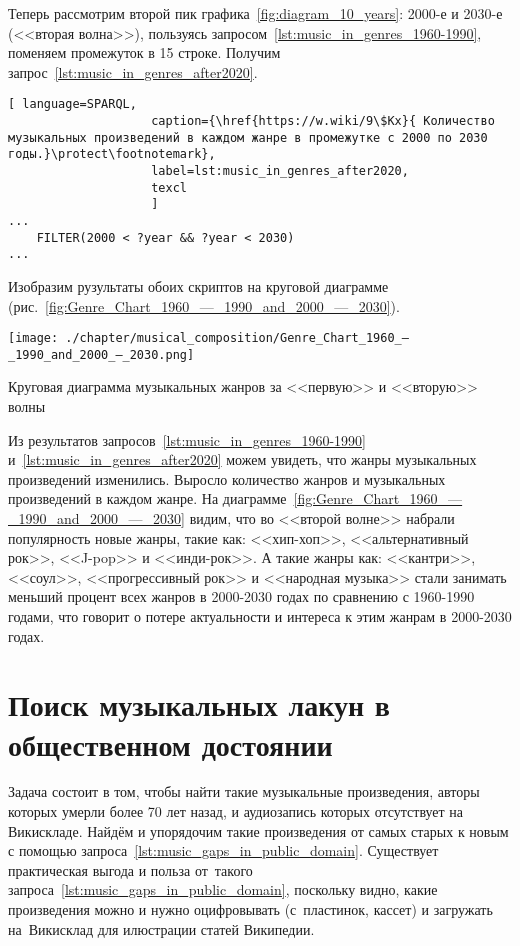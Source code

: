 \newpage
Теперь рассмотрим второй пик графика~\ref{fig:diagram_10_years}: 2000-е и 2030-е (<<вторая волна>>), пользуясь запросом~\ref{lst:music_in_genres_1960-1990}, поменяем промежуток в 15 строке. Получим запрос~\ref{lst:music_in_genres_after2020}.

\begin{lstlisting}[ language=SPARQL,
                    caption={\href{https://w.wiki/9\$Kx}{ Количество музыкальных произведений в каждом жанре в промежутке с 2000 по 2030 годы.}\protect\footnotemark},
                    label=lst:music_in_genres_after2020,
                    texcl 
                    ]
...
    FILTER(2000 < ?year && ?year < 2030)
...
\end{lstlisting}%

Изобразим рузультаты обоих скриптов на круговой диаграмме (рис.~\ref{fig:Genre_Chart_1960_—_1990_and_2000_—_2030}).

\begin{marginfigure}[0\baselineskip]
	\texttt{[image: ./chapter/musical\_composition/Genre\_Chart\_1960\_—\_1990\_and\_2000\_—\_2030.png]}
	\caption{Круговая диаграмма музыкальных жанров за <<первую>> и <<вторую>> волны}%
	\label{fig:Genre_Chart_1960_—_1990_and_2000_—_2030}%
\end{marginfigure}

Из результатов запросов~\ref{lst:music_in_genres_1960-1990} 
и~\ref{lst:music_in_genres_after2020} можем увидеть, что жанры музыкальных произведений изменились.
Выросло количество жанров и музыкальных произведений в каждом жанре. 
На диаграмме~\ref{fig:Genre_Chart_1960_—_1990_and_2000_—_2030} видим, что во <<второй волне>> набрали популярность новые жанры, такие как: <<хип-хоп>>, <<альтернативный рок>>, <<J-pop>> и <<инди-рок>>. А такие жанры как: <<кантри>>, <<соул>>, <<прогрессивный рок>> и <<народная музыка>> стали занимать меньший процент всех жанров в 2000-2030 годах по сравнению с 1960-1990 годами, что говорит о потере актуальности и интереса к этим жанрам в 2000-2030 годах.




\newpage
\section{Поиск музыкальных лакун в общественном достоянии}

Задача состоит в том, чтобы найти такие музыкальные произведения, 
авторы которых умерли более 70 лет назад, 
и аудиозапись которых отсутствует на Викискладе. 
Найдём и упорядочим такие произведения от самых старых к новым 
с помощью запроса~\ref{lst:music_gaps_in_public_domain}. 
Существует практическая выгода и польза от~такого запроса~\ref{lst:music_gaps_in_public_domain}, 
поскольку видно, какие произведения можно и нужно оцифровывать 
(с~пластинок, кассет) и загружать на~Викисклад для илюстрации статей Википедии.

